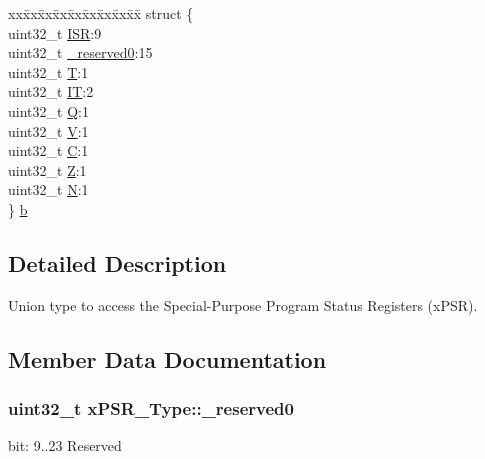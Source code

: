 \begin{DoxyCompactItemize}
\begin{tabbing}
\end{tabbing}\item 
\begin{tabbing}
xx\=xx\=xx\=xx\=xx\=xx\=xx\=xx\=xx\=\kill
struct \{\\
\>uint32\_t \hyperlink{unionx_p_s_r___type_a3e9120dcf1a829fc8d2302b4d0673970}{ISR}:9\\
\>uint32\_t \hyperlink{unionx_p_s_r___type_af438e0f407357e914a70b5bd4d6a97c5}{\_reserved0}:15\\
\>uint32\_t \hyperlink{unionx_p_s_r___type_a7eed9fe24ae8d354cd76ae1c1110a658}{T}:1\\
\>uint32\_t \hyperlink{unionx_p_s_r___type_a3200966922a194d84425e2807a7f1328}{IT}:2\\
\>uint32\_t \hyperlink{unionx_p_s_r___type_add7cbd2b0abd8954d62cd7831796ac7c}{Q}:1\\
\>uint32\_t \hyperlink{unionx_p_s_r___type_af14df16ea0690070c45b95f2116b7a0a}{V}:1\\
\>uint32\_t \hyperlink{unionx_p_s_r___type_a40213a6b5620410cac83b0d89564609d}{C}:1\\
\>uint32\_t \hyperlink{unionx_p_s_r___type_a1e5d9801013d5146f2e02d9b7b3da562}{Z}:1\\
\>uint32\_t \hyperlink{unionx_p_s_r___type_a2db9a52f6d42809627d1a7a607c5dbc5}{N}:1\\
\} \hyperlink{unionx_p_s_r___type_aadeab5e1061c379c66bd3e4c97c1c413}{b}\\

\end{tabbing}\end{DoxyCompactItemize}


\subsection{Detailed Description}
Union type to access the Special-\/\-Purpose Program Status Registers (x\-P\-S\-R). 

\subsection{Member Data Documentation}
\hypertarget{unionx_p_s_r___type_af438e0f407357e914a70b5bd4d6a97c5}{
\subsubsection[{\-\_\-reserved0}]{\setlength{\rightskip}{0pt plus 5cm}uint32\-\_\-t x\-P\-S\-R\-\_\-\-Type\-::\-\_\-reserved0}}\label{unionx_p_s_r___type_af438e0f407357e914a70b5bd4d6a97c5}
bit\-: 9..23 Reserved

